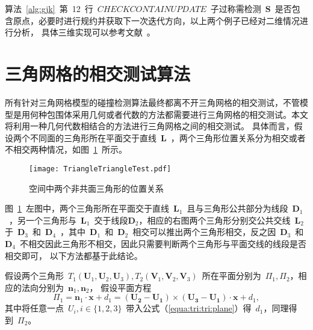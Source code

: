 算法~\ref{alg:gjk}~第~12~行~$CHECKCONTAINUPDATE$~子过称需检测~$\bm{S}$~是否包含原点，必要时进行规约并获取下一次迭代方向，以上两个例子已经对二维情况进行分析，
具体三维实现可以参考文献~。

\FloatBarrier
\section{三角网格的相交测试算法}
\label{sec:intersection:triangles}

所有针对三角网格模型的碰撞检测算法最终都离不开三角网格的相交测试，不管模型是用何种包围体采用几何或者代数的方法都需要进行三角网格的相交测试。本文将利用一种几何代数相结合的方法进行三角网格之间的相交测试。
具体而言，假设两个不同面的三角形所在平面交于直线~$\bm{L}$~，两个三角形位置关系分为相交或者不相交两种情况，如图~\ref{fig:two:triangle:ui}~所示。

\begin{figure}[!ht]
  \centering
    \texttt{[image: TriangleTriangleTest.pdf]}
    \caption{空间中两个非共面三角形的位置关系\cite{Moller1997}}
  \label{fig:two:triangle:ui}
\end{figure}

图~\ref{fig:two:triangle:ui}~左图中，两个三角形所在平面交于直线~$\bm{L}_1$~且与三角形公共部分为线段~$\bm{D}_1$~，另一个三角形与~$\bm{L}_1$~交于线段$\bm{D}_2$，相应的右图两个三角形分别交公共交线~$\bm{L}_2$~
于~$\bm{D}_3$~和~$\bm{D}_4$~，其中~$\bm{D}_1$~和~$\bm{D}_2$~相交可以推出两个三角形相交，反之因~$\bm{D}_3$~和~$\bm{D}_4$~不相交因此三角形不相交，因此只需要判断两个三角形与平面交线的线段是否相交即可\cite{Moller1997}，
以下方法都基于此结论。

假设两个三角形~$T_1(\bm{U}_1,\bm{U}_2,\bm{U}_3), T_2(\bm{V}_1,\bm{V}_2,\bm{V}_3)$~所在平面分别为~$\Pi_1, \Pi_2$，相应的法向分别为~$\bm{n}_1, \bm{n}_2$，
假设平面方程~
\begin{equation}
  \Pi_1 = \bm{n}_1 \cdot \bm{x}+d_1 = (\bm{U_2} - \bm{U_1}) \times (\bm{U_3}-\bm{U_1})  \cdot \bm{x} + d_1,
\label{equa:tri:tri:plane}
\end{equation}
其中将任意一点~$U_i, i \in \{1,2,3\}$~带入公式（\ref{equa:tri:tri:plane}）得~$d_1$，同理得到~$\Pi_2$。


